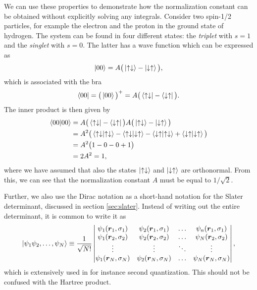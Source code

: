 We can use these properties to demonstrate how the normalization constant can be obtained without explicitly solving any integrals. Consider two spin-1/2 particles, for example the electron and the proton in the ground state of hydrogen. The system can be found in four different states: the \textit{triplet} with $s=1$ and the \textit{singlet} with $s=0$. The latter has a wave function which can be expressed as \cite{griffiths_introduction_2005}
\begin{equation}
\ket{00}=A\big(\ket{\uparrow\downarrow}-\ket{\downarrow\uparrow}\big),
\end{equation}
which is associated with the bra
\begin{equation}
\bra{00}=\big(\ket{00}\big)^+=A\big(\bra{\uparrow\downarrow}-\bra{\downarrow\uparrow}\big).
\end{equation}
The inner product is then given by
\begin{equation}
\begin{aligned}
\braket{00}{00}&=A\big(\bra{\uparrow\downarrow}-\bra{\downarrow\uparrow}\big)A\big(\ket{\uparrow\downarrow}-\ket{\downarrow\uparrow}\big)\\
&=A^2\big(\braket{\uparrow\downarrow}{\uparrow\downarrow}-\braket{\uparrow\downarrow}{\downarrow\uparrow}-\braket{\downarrow\uparrow}{\uparrow\downarrow}+\braket{\downarrow\uparrow}{\downarrow\uparrow}\big)\\
&=A^2\big(1-0-0+1\big)\\
&=2A^2=1,
\end{aligned}
\end{equation}
where we have assumed that also the states $\ket{\uparrow\downarrow}$ and $\ket{\downarrow\uparrow}$ are orthonormal. From this, we can see that the normalization constant $A$ must be equal to $1/\sqrt{2}$.

Further, we also use the Dirac notation as a short-hand notation for the Slater determinant, discussed in section \ref{sec:slater}. Instead of writing out the entire determinant, it is common to write it as
\begin{equation}
\ket{\psi_1\psi_2,\hdots,\psi_N}\equiv\frac{1}{\sqrt{N!}}
\begin{vmatrix}
\psi_1(\boldsymbol{r}_1,\sigma_1) & \psi_2(\boldsymbol{r}_1,\sigma_1) & \hdots & \psi_n(\boldsymbol{r}_1,\sigma_1)\\
\psi_1(\boldsymbol{r}_2,\sigma_2) & \psi_2(\boldsymbol{r}_2,\sigma_2) & \hdots & \psi_N(\boldsymbol{r}_2,\sigma_2)\\
\vdots & \vdots & \ddots & \vdots \\
\psi_1(\boldsymbol{r}_N,\sigma_N) & \psi_2(\boldsymbol{r}_N,\sigma_N) & \hdots & \psi_N(\boldsymbol{r}_N,\sigma_N)
\end{vmatrix},
\end{equation}
which is extensively used in for instance second quantization. This should not be confused with the Hartree product. 